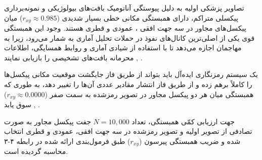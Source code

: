 




تصاویر پزشکی اولیه به دلیل پیوستگی آناتومیک بافت‌های بیولوژیکی و نمونه‌برداری پیکسلی متراکم، دارای همبستگی مکانی خطی بسیار شدیدی ($r_{xy} \approx 0.985$) میان پیکسل‌های مجاور در سه جهت افقی ، عمودی  و قطری  هستند. وجود این همبستگی قوی یکی از اصلی‌ترین کانال‌های نفوذ در حملات تحلیل آماری به شمار می‌رود، زیرا به مهاجمان اجازه می‌دهد تا با استفاده از شیادی آماری و روابط همسایگی، اطلاعات محرمانه بافت‌های تشخیصی را بازیابی نمایند , .\par



یک سیستم رمزنگاری ایده‌آل باید بتواند از طریق فاز جایگشت  موقعیت مکانی پیکسل‌ها را کاملاً برهم زده و از طریق فاز انتشار  مقادیر عددی آن‌ها را تغییر دهد، به طوری که همبستگی میان هر دو پیکسل مجاور در تصویر رمزشده به سمت صفر ($r_{xy} \approx 0.0000$) سوق یابد , .\par



جهت ارزیابی کمّی همبستگی، تعداد $N = 10,\allowbreak{}000$ جفت پیکسل مجاور به صورت تصادفی از تصویر اولیه و تصویر رمزشده در سه جهت افقی، عمودی و قطری انتخاب شده و ضریب همبستگی پیرسون ($r_{xy}$) طبق فرمول‌بندی ارائه شده در رابطه ۴{-}۳ محاسبه گردیده است.\par




